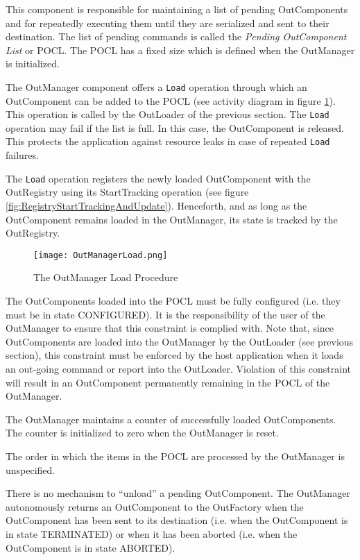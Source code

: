 This component is responsible for maintaining a list of pending OutComponents and for repeatedly executing them until they are serialized and sent to their destination.
The list of pending commands is called the \textit{Pending OutComponent List} or POCL. The POCL has a fixed size which is defined when the OutManager is initialized. 

The OutManager component offers a \texttt{Load} operation through which an OutComponent can be added to the POCL (see activity diagram in figure \ref{fig:OutManagerLoad}). This operation is called by the OutLoader of the previous section. The \texttt{Load} operation may fail if the list is full. In this case, the OutComponent is released. This protects the application against resource leaks in case of repeated \texttt{Load} failures.

The \texttt{Load} operation registers the newly loaded OutComponent with the OutRegistry using its StartTracking operation (see figure \ref{fig:RegistryStartTrackingAndUpdate}). Henceforth, and as long as the OutComponent remains loaded in the OutManager, its state is tracked by the OutRegistry. 

\begin{figure}[h]
 \centering
 \texttt{[image: OutManagerLoad.png]}
 \caption{The OutManager Load Procedure}
 \label{fig:OutManagerLoad}
\end{figure}

The OutComponents loaded into the POCL must be fully configured (i.e. they must be in state CONFIGURED). It is the responsibility of the user of the OutManager to ensure that this constraint is complied with. Note that, since OutComponents are loaded into the OutManager by the OutLoader (see previous section), this constraint must be enforced by the host application when it loads an out-going command or report into the OutLoader. Violation of this constraint will result in an OutComponent permanently remaining in the POCL of the OutManager.

The OutManager maintains a counter of successfully loaded OutComponents. The counter is initialized to zero when the OutManager is reset.

The order in which the items in the POCL are processed by the OutManager is unspecified.

There is no mechanism to “unload” a pending OutComponent. The OutManager autonomously returns an OutComponent to the OutFactory when the OutComponent has been sent to its destination (i.e. when the OutComponent is in state TERMINATED) or when it has been aborted (i.e. when the OutComponent is in state ABORTED). 

